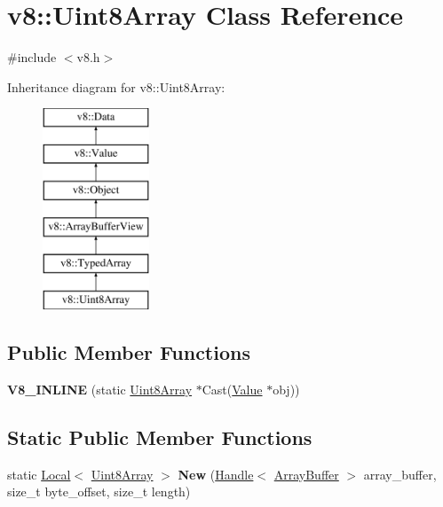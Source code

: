 \hypertarget{classv8_1_1_uint8_array}{}\section{v8\+:\+:Uint8\+Array Class Reference}
\label{classv8_1_1_uint8_array}


{\ttfamily \#include $<$v8.\+h$>$}

Inheritance diagram for v8\+:\+:Uint8\+Array\+:\begin{figure}[H]
\begin{center}
\leavevmode
\includegraphics[height=6.000000cm]{classv8_1_1_uint8_array}
\end{center}
\end{figure}
\subsection*{Public Member Functions}
\begin{DoxyCompactItemize}
\item 
\hypertarget{classv8_1_1_uint8_array_a3a934d777e7867aee673813c36659950}{}{\bfseries V8\+\_\+\+I\+N\+L\+I\+N\+E} (static \hyperlink{classv8_1_1_uint8_array}{Uint8\+Array} $\ast$Cast(\hyperlink{classv8_1_1_value}{Value} $\ast$obj))\label{classv8_1_1_uint8_array_a3a934d777e7867aee673813c36659950}

\end{DoxyCompactItemize}
\subsection*{Static Public Member Functions}
\begin{DoxyCompactItemize}
\item 
\hypertarget{classv8_1_1_uint8_array_a6033f331f7d059456bf871d3a8e8da44}{}static \hyperlink{classv8_1_1_local}{Local}$<$ \hyperlink{classv8_1_1_uint8_array}{Uint8\+Array} $>$ {\bfseries New} (\hyperlink{classv8_1_1_handle}{Handle}$<$ \hyperlink{classv8_1_1_array_buffer}{Array\+Buffer} $>$ array\+\_\+buffer, size\+\_\+t byte\+\_\+offset, size\+\_\+t length)\label{classv8_1_1_uint8_array_a6033f331f7d059456bf871d3a8e8da44}

\end{DoxyCompactItemize}
